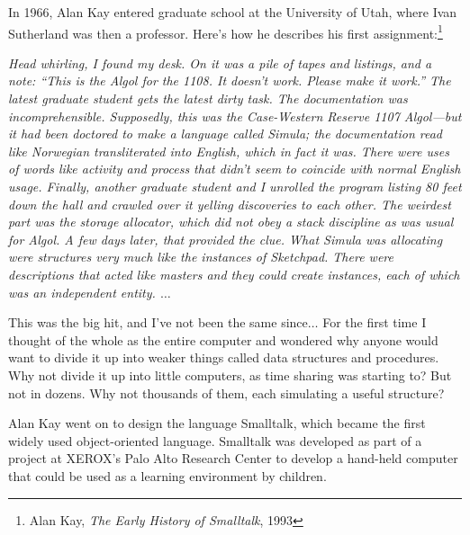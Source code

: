 \begin{schemeregion}
In 1966, Alan Kay entered graduate school at the University of Utah, where Ivan Sutherland was then a professor.  Here's how he describes his first assignment:\footnote{Alan Kay, \emph{The Early History of Smalltalk}, 1993}
\begin{smallquote}
{\em
Head whirling, I found my desk. On it was a pile of tapes and listings, and a note: ``This is the Algol for the 1108. It doesn't work. Please make it work.'' The latest graduate student gets the latest dirty task. The documentation was incomprehensible. Supposedly, this was the Case-Western Reserve 1107 Algol---but it had been doctored to make a language called Simula; the documentation read like Norwegian transliterated into English, which in fact it was. There were uses of words like activity and process that didn't seem to coincide with normal English usage.  
Finally, another graduate student and I unrolled the program listing 80 feet down the hall and crawled over it yelling discoveries to each other. The weirdest part was the storage allocator, which did not obey a stack discipline as was usual for Algol. A few days later, that provided the clue. 
What Simula was allocating were structures very much like the instances of Sketchpad. There were descriptions that acted like masters and they could create instances, each of which was an independent entity. $\ldots$ 

This was the big hit, and I've not been the same since$\ldots$ For the first time I thought of the whole as the entire computer and wondered why anyone would want to divide it up into weaker things called data structures and procedures. Why not divide it up into little computers, as time sharing was starting to? But not in dozens. Why not thousands of them, each simulating a useful structure? }
\end{smallquote}
Alan Kay went on to design the language Smalltalk, which became the first widely used object-oriented language.  Smalltalk was developed as part of a project at XEROX's Palo Alto Research Center to develop a hand-held computer that could be used as a learning environment by children.


\end{schemeregion}
